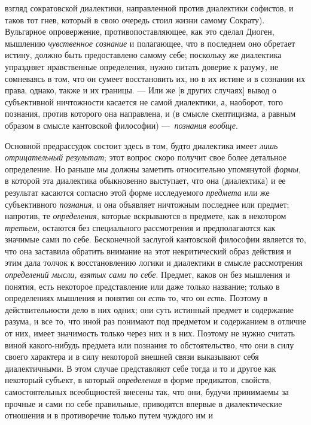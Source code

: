 \documentclass[twoside]{article}
\begin{document}
взгляд сократовской диалектики, направленной против диалектики софистов, и
таков тот гнев, который в свою очередь стоил жизни самому Сократу).
Вульгарное опровержение, противопоставляющее, как это сделал Диоген,
мышлению {\em чувственное сознание}
и полагающее, что в последнем оно обретает истину, должно
быть предоставлено самому себе; поскольку же диалектика упраздняет
нравственные определения, нужно питать доверие к разуму, не сомневаясь в
том, что он сумеет восстановить их, но в их истине и в сознании их права,
однако, также и их границы. — Или же [в других случаях]
вывод о субъективной ничтожности касается не самой диалектики, а, наоборот,
того познания, против которого она направлена, и (в смысле скептицизма, а
равным образом в смысле кантовской философии)
—~{\em познания вообще}.

Основной предрассудок состоит здесь в том, будто диалектика
имеет {\em лишь отрицательный
результат}; этот вопрос скоро получит свое более детальное
определение. Но раньше мы должны заметить относительно упомянутой
{\em формы}, в которой
эта диалектика обыкновенно выступает, что она (диалектика) и ее результат
касаются согласно этой форме исследуемого
{\em предмета} или же
субъективного {\em познания},
и она объявляет ничтожным последнее или предмет; напротив, те
{\em определения},
которые вскрываются в предмете, как в некотором
{\em третьем}, остаются
без специального рассмотрения и предполагаются как значимые сами по себе.
\label{bkm:bm126a}Бесконечной заслугой кантовской философии
является то, что она заставила обратить внимание на этот некритический
образ действия и этим дала толчок к восстановлению логики и диалектики в
смысле рассмотрения {\em определений
мысли, взятых сами по себе}. Предмет, каков он без мышления
и понятия, есть некоторое представление или даже только название; только в
определениях мышления и понятия он
{\em есть} то, что он
{\em есть}. Поэтому в
действительности дело в них одних; они суть истинный предмет и содержание
разума, и все то, что иной раз понимают под предметом и содержанием в
отличие от них, имеет значимость только через них и в них. Поэтому не нужно
считать виной какого-нибудь предмета или познания то обстоятельство, что
они в силу своего характера и в силу некоторой внешней связи выказывают
себя диалектичными. В этом случае представляют себе тогда и то и другое как
некоторый субъект, в который
{\em определения} в форме
предикатов, свойств, самостоятельных всеобщностей внесены так, что они,
будучи принимаемы за прочные и сами по себе правильные, приводятся впервые
в диалектические отношения и в противоречие только путем чуждого им и
\end{document}
